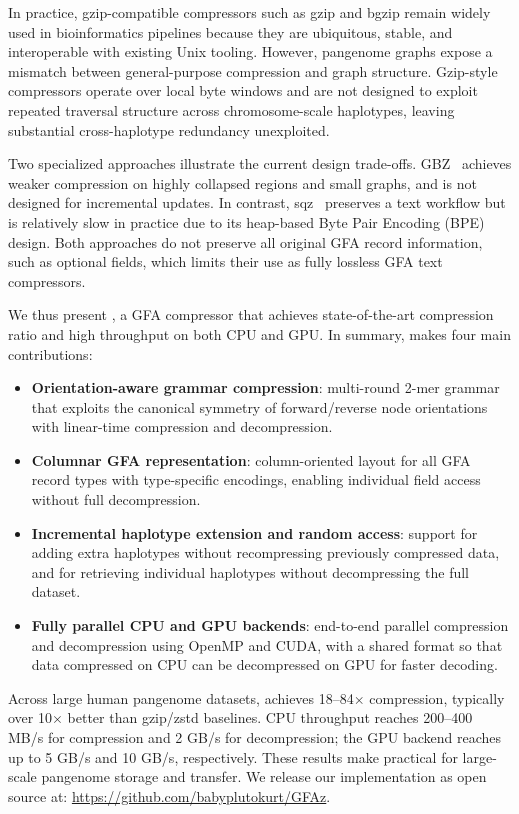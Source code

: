 In practice, gzip-compatible compressors such as gzip and bgzip remain widely used in bioinformatics pipelines because they are ubiquitous, stable, and interoperable with existing Unix tooling. However, pangenome graphs expose a mismatch between general-purpose compression and graph structure. Gzip-style compressors operate over local byte windows and are not designed to exploit repeated traversal structure across chromosome-scale haplotypes, leaving substantial cross-haplotype redundancy unexploited.

Two specialized approaches illustrate the current design trade-offs. GBZ~\cite{siren2022gbz} achieves weaker compression on highly collapsed regions and small graphs, and is not designed for incremental updates. In contrast, sqz~\cite{heringer2025human} preserves a text workflow but is relatively slow in practice due to its heap-based Byte Pair Encoding (BPE) design. Both approaches do not preserve all original GFA record information, such as optional fields, which limits their use as fully lossless GFA text compressors.

We thus present \gfaz, a GFA compressor that achieves state-of-the-art compression ratio and high throughput on both CPU and GPU. In summary, \gfaz makes four main contributions:

\begin{itemize}[noitemsep, topsep=2pt, leftmargin=*]
    \item \textbf{Orientation-aware grammar compression}: multi-round 2-mer grammar that exploits the canonical symmetry of forward/reverse node orientations with linear-time compression and decompression.
    \item \textbf{Columnar GFA representation}: column-oriented layout for all GFA record types with type-specific encodings, enabling individual field access without full decompression.
    \item \textbf{Incremental haplotype extension and random access}: support for adding extra haplotypes without recompressing previously compressed data, and for retrieving individual haplotypes without decompressing the full dataset.
    \item \textbf{Fully parallel CPU and GPU backends}: end-to-end parallel compression and decompression using OpenMP and CUDA, with a shared format so that data compressed on CPU can be decompressed on GPU for faster decoding.
\end{itemize}

Across large human pangenome datasets, \gfaz achieves 18--84$\times$ compression, typically over 10$\times$ better than gzip/zstd baselines. CPU throughput reaches 200--400 MB/s for compression and 2 GB/s for decompression; the GPU backend reaches up to 5 GB/s and 10 GB/s, respectively. These results make \gfaz practical for large-scale pangenome storage and transfer. We release our implementation as open source at: \href{https://github.com/babyplutokurt/GFAz}{https://github.com/babyplutokurt/GFAz}.
